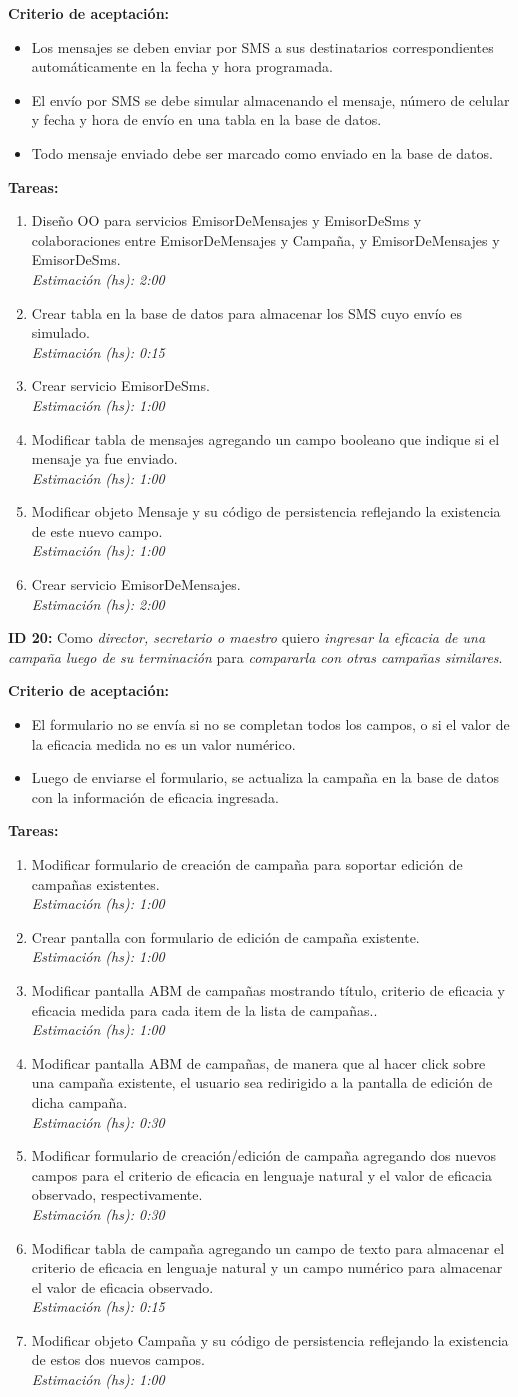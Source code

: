 \documentclass[a4paper, 10pt, twoside]{article}
\newcommand{\sprintstory}[4]{
  \noindent
  \textbf{ID #1:} Como \emph{#2} quiero \emph{#3} para \emph{#4}.
}
\newenvironment{criterios}{
  \textbf{Criterio de aceptación:}
  \begin{itemize}
}{
  \end{itemize}
}
\newcommand{\criterio}[1] {
  \item #1
}
\newenvironment{tasks}{
  \textbf{Tareas:}
  \begin{enumerate}
}{
  \end{enumerate}
}
\newcommand{\task}[2] {
  \item #1.\\
  \emph{Estimación (hs): #2}
}
\begin{document}
\begin{criterios}
  \criterio{Los mensajes se deben enviar por SMS a sus destinatarios correspondientes automáticamente en la fecha y hora programada.}
  \criterio{El envío por SMS se debe simular almacenando el mensaje, número de celular y fecha y hora de envío en una tabla en la base de datos.}
  \criterio{Todo mensaje enviado debe ser marcado como enviado en la base de datos.}
\end{criterios}

\begin{tasks}
  \task{Diseño OO para servicios EmisorDeMensajes y EmisorDeSms y colaboraciones entre EmisorDeMensajes y Campaña, y EmisorDeMensajes y EmisorDeSms}{2:00}
  \task{Crear tabla en la base de datos para almacenar los SMS cuyo envío es simulado}{0:15}
  \task{Crear servicio EmisorDeSms}{1:00}
  \task{Modificar tabla de mensajes agregando un campo booleano que indique si el mensaje ya fue enviado}{1:00}
  \task{Modificar objeto Mensaje y su código de persistencia reflejando la existencia de este nuevo campo}{1:00}
  \task{Crear servicio EmisorDeMensajes}{2:00}
\end{tasks}

\sprintstory{20}
            {director, secretario o maestro}
            {ingresar la eficacia de una campaña luego de su terminación}
            {compararla con otras campañas similares}

\begin{criterios}
  \criterio{El formulario no se envía si no se completan todos los campos, o si el valor de la eficacia medida no es un valor numérico.}
  \criterio{Luego de enviarse el formulario, se actualiza la campaña en la base de datos con la información de eficacia ingresada.}
\end{criterios}

\begin{tasks}
  \task{Modificar formulario de creación de campaña para soportar edición de campañas existentes}{1:00}
  \task{Crear pantalla con formulario de edición de campaña existente}{1:00}
  \task{Modificar pantalla ABM de campañas mostrando título, criterio de eficacia y eficacia medida para cada item de la lista de campañas.}{1:00}
  \task{Modificar pantalla ABM de campañas, de manera que al hacer click sobre una campaña existente, el usuario sea redirigido a la pantalla de edición de dicha campaña}{0:30}
  \task{Modificar formulario de creación/edición de campaña agregando dos nuevos campos para el criterio de eficacia en lenguaje natural y el valor de eficacia observado, respectivamente}{0:30}
  \task{Modificar tabla de campaña agregando un campo de texto para almacenar el criterio de eficacia en lenguaje natural y un campo numérico para almacenar el valor de eficacia observado}{0:15}
  \task{Modificar objeto Campaña y su código de persistencia reflejando la existencia de estos dos nuevos campos}{1:00}
\end{tasks}
\end{document}
